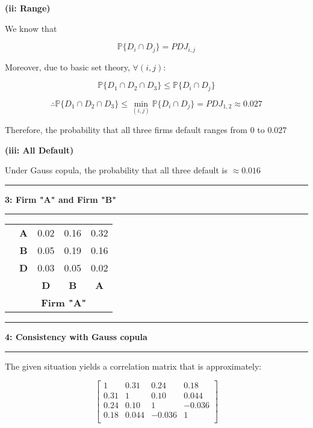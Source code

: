 \documentclass[11pt]{article}
\newcommand\question[2]{\vspace{.25in}\hrule\textbf{#1: #2}\vspace{.5em}\hrule\vspace{.10in}}
\renewcommand\part[1]{\vspace{.10in}\textbf{(#1)}}
\renewcommand{\P}{\mathbb{P}}
\begin{document}
\part{ii: Range}

We know that 

$$
\P\{D_i \cap D_j\} = PDJ_{i, j}
$$

Moreover, due to basic set theory, $\forall(i, j)$:

$$
\P\{D_1 \cap D_2 \cap D_3\} \leq \P\{D_i \cap D_j\}
$$

$$
\therefore
\P\{D_1 \cap D_2 \cap D_3\} \leq \min_{(i, j)} \P\{D_i \cap D_j\}
= PDJ_{1, 2}
\approx 0.027
$$

Therefore, the probability that all three firms default ranges from
$0$ to $0.027$

\part{iii: All Default}

Under Gauss copula, the probability that all three default is
$\approx 0.016$

\question{3}{Firm "A" and Firm "B"}

\begin{center}
	\begin{tabular}{c c|c|c|c}
  	\cline{2-5}
  	\multirow{3}{*}{\rotatebox[origin=c]{90}{\textbf{Firm "B"}}}
  	& \textbf{A} & 0.02 & 0.16 & 0.32 \\
  	\cline{2-5}
  	& \textbf{B} & 0.05 & 0.19 & 0.16 \\
  	\cline{2-5}
  	& \textbf{D} & 0.03 & 0.05 & 0.02 \\
  	\cline{2-5}
  	& \textbf{} & \textbf{D} & \textbf{B} & \textbf{A} \\
  	\cline{2-5} 
  	\multicolumn{1}{c}{} & \multicolumn{4}{c}{\textbf{Firm "A"}}
	\end{tabular}
\end{center}

\question{4}{Consistency with Gauss copula}

The given situation yields a correlation matrix that is 
approximately:

$$
\left[
\begin{matrix}
1 & 0.31 & 0.24 & 0.18 \\
0.31 & 1 & 0.10 & 0.044 \\
0.24 & 0.10 & 1 & -0.036 \\
0.18 & 0.044 & -0.036 & 1 \\
\end{matrix}
\right]
$$
\end{document}
